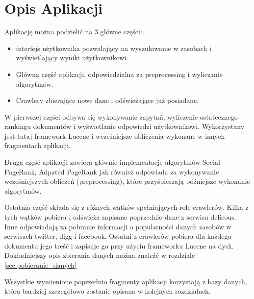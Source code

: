 \section{Opis Aplikacji}

Aplikację można podzielić na 3 główne części:

\begin{itemize}
\item interfejs użytkownika pozwalający na wyszukiwanie w zasobach i wyświetlający wyniki użytkownikowi.
\item Główną część aplikacji, odpowiedzialna za preprocessing i wyliczanie algorytmów.
\item Crawlery zbierające nowe dane i odświeżające już posiadane.
\end{itemize}

W pierwszej części odbywa się wykonywanie zapytań, wyliczenie ostatecznego rankingu dokumentów i wyświetlanie odpowiedzi użytkownikowi. Wykorzystany jest tutaj framework Lucene i wcześniejsze obliczenia wykonane w innych fragmentach aplikacji. 

Druga część aplikacji zawiera głównie implementacje algorytmów Social PageRank, Adpated PageRank jak również odpowiada za wykonywanie wcześniejszych obliczeń (preprocessing), które przyśpieszają późniejsze wykonanie algorytmów. 


Ostatnia część składa się z różnych wątków spełniających rolę crawlerów. Kilka z tych wątków pobiera i odświeża zapisane poprzednio dane z serwisu delicous. Inne odpowiadają za pobranie informacji o popularności danych zasobów w serwisach twitter, digg i facebook. Ostatni z crawlerów pobiera dla każdego dokumentu jego treść i zapisuje go przy użyciu frameworku Lucene na dysk. Dokładniejszy opis zbierania danych można znaleźć w rozdziale \ref{sec:pobieranie_danych}

Wszystkie wymienione poprzednio fragmenty aplikacji korzystają z bazy danych, która bardziej szczegółowo zostanie opisana w kolejnych rozdziałach.